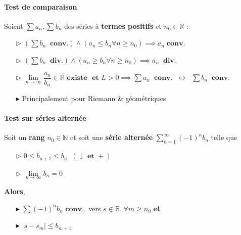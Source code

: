 \documentclass[2pt]{report}
\begin{document}
\begin{multicols*}{3}
    
     \paragraph{Test de comparaison}
     Soient $\sum a_n, \sum b_n$ des séries à \textbf{termes positifs} 
     et $n_0 \in \mathbb{R}$ :
     \begin{itemize}
         \item[$\rhd$ ] $\left(\sum   b_n  \;\; \textbf{conv.}\right) \land 
             (a_n \leq b_n \forall n \geq n_0) 
             \implies a_n \; \textbf{conv.}$ 
         \item[$\rhd$ ] $\left(\sum   b_n  \;\; \textbf{div.}\right) \land 
             (a_n \geq b_n \forall n \geq n_0) 
             \implies a_n \;\; \textbf{div.}$ 
         \item[$\rhd$ ] $\lim\limits_{n\to\infty}\dfrac{a_n}{b_n}
             \in \mathbb{R} \textbf{ existe } \textbf{ et } L > 0 
             \implies 
        \sum a_n \;\; \textbf{conv.} \;\; \leftrightarrow \;\; 
        \sum b_n \;\; \textbf{conv.}$ 
    \item[$\blacktriangleright$] Principalement pour Riemann \& géométriques
     \end{itemize}

     

     \paragraph{Test sur séries alternée}
     Soit un \textbf{rang} $n_0 \in \mathbb{N}$ et 
     soit une \textbf{série alternée} 
     $\sum_{n=1}^{\infty } (-1)^nb_n$ telle que 
     \begin{itemize}
        \item[$\rhd$]  $0 \leq b_{n+1} \leq b_n \;\;(\downarrow \textbf{ et } +)$ 
        \item[$\rhd$] $\lim\limits_{n\to\infty }b_n = 0$ 
     \end{itemize}
     \textbf{Alors}, 
     \begin{itemize}
         \item[$\blacktriangleright$]
     $\sum  (-1)^nb_n \textbf{ conv. }$ vers $s \in
     \mathbb{R} \;\; \forall 
     m \geq n_0 $ \textbf{et}  
        \item[$\blacktriangleright$] 
    $|s - s_m| \leq b_{m+1}$
     \end{itemize}

 \end{multicols*}
\end{document}
